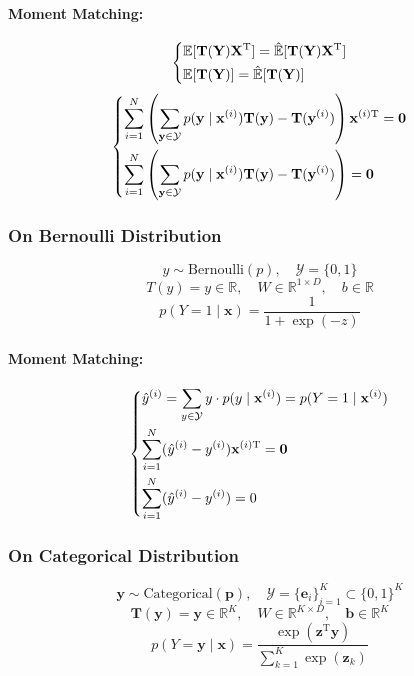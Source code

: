 \documentclass{article}
\begin{document}
\paragraph{Moment Matching:}
\[
    \begin{dcases}
        \mathbb{E}[\mathbf{T}(\mathbf{Y})\mathbf{X}^{\mathrm{T}}] = \hat{\mathbb{E}}[\mathbf{T}(\mathbf{Y})\mathbf{X}^{\mathrm{T}}] \\
        \mathbb{E}[\mathbf{T}(\mathbf{Y})] = \hat{\mathbb{E}}[\mathbf{T}(\mathbf{Y})]
    \end{dcases}
\]
\[
    \begin{dcases}
        \sum_{i=1}^N \left(\sum_{\mathbf{y} \in \mathcal{Y}} p(\mathbf{y} \mid \mathbf{x}^{(i)}) \mathbf{T}(\mathbf{y}) - \mathbf{T}(\mathbf{y}^{(i)})\right) \mathbf{x}^{(i)\mathrm{T}} = \mathbf{0} \\
        \sum_{i=1}^N \left(\sum_{\mathbf{y} \in \mathcal{Y}} p(\mathbf{y} \mid \mathbf{x}^{(i)}) \mathbf{T}(\mathbf{y}) - \mathbf{T}(\mathbf{y}^{(i)})\right) = \mathbf{0}
    \end{dcases}
\]

\subsubsection{On Bernoulli Distribution}
\[
    y \sim \text{Bernoulli}(p), \quad \mathcal{Y} = \{0, 1\}
\]
\[
    T(y) = y \in \mathbb{R}, \quad W \in \mathbb{R}^{1 \times D}, \quad b \in \mathbb{R}
\]
\[
    p(Y=1 \mid \mathbf{x}) = \frac{1}{1 + \exp(-z)}
\]
\paragraph{Moment Matching:}
\[
    \begin{dcases}
        \hat{y}^{(i)} = \sum_{y \in \mathcal{Y}} y \cdot p(y \mid \mathbf{x}^{(i)}) = p(Y=1 \mid \mathbf{x}^{(i)}) \\
        \sum_{i=1}^N (\hat{y}^{(i)} - y^{(i)}) \mathbf{x}^{(i)\mathrm{T}} = \mathbf{0} \\
        \sum_{i=1}^N (\hat{y}^{(i)} - y^{(i)}) = 0
    \end{dcases}
\]

\subsubsection{On Categorical Distribution}
\[
    \mathbf{y} \sim \text{Categorical}(\mathbf{p}), \quad \mathcal{Y} = \{\mathbf{e}_i\}_{i=1}^{K} \subset \{0, 1\}^K
\]
\[
    \mathbf{T}(\mathbf{y}) = \mathbf{y} \in \mathbb{R}^K, \quad W \in \mathbb{R}^{K \times D}, \quad \mathbf{b} \in \mathbb{R}^K
\]
\[
    p(Y=\mathbf{y} \mid \mathbf{x}) = \frac{\exp(\mathbf{z}^{\mathrm{T}} \mathbf{y})}{\sum_{k=1}^K \exp(\mathbf{z}_k)}
\]
\end{document}
